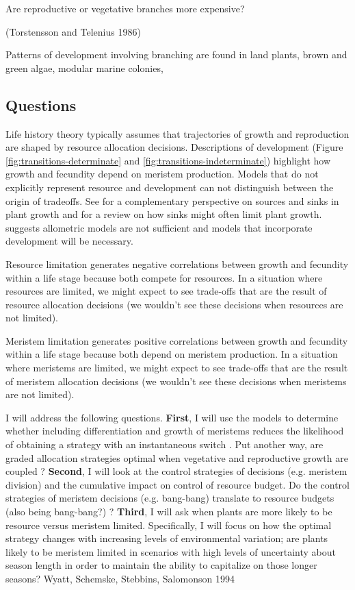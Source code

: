 \documentclass[12pt, oneside]{article}   	%
\begin{document}
Are reproductive or vegetative branches more expensive?

(Torstensson and Telenius 1986) 

Patterns of development involving branching are found in land plants, brown and green algae, modular marine colonies, 
\fi

\subsection{Questions}

Life history theory typically assumes that trajectories of growth and reproduction are shaped by resource allocation decisions. Descriptions of development (Figure \ref{fig:transitions-determinate} and \ref{fig:transitions-indeterminate}) highlight how growth and fecundity depend on meristem production. Models that do not explicitly represent resource and development can not distinguish between the origin of tradeoffs. See \cite{white2016} for a complementary perspective on sources and sinks in plant growth and \cite{korner2015} for a review on how sinks might often limit plant growth. \cite{Fox1992} suggests allometric models are not sufficient and models that incorporate development will be necessary.

Resource limitation generates negative correlations between growth and fecundity within a life stage because both compete for resources. In a situation where resources are limited, we might expect to see trade-offs that are the result of resource allocation decisions (we wouldn't see these decisions when resources are not limited).

Meristem limitation generates positive correlations between growth and fecundity within a life stage because both depend on meristem production. In a situation where meristems are limited, we might expect to see trade-offs that are the result of meristem allocation decisions (we wouldn't see these decisions when meristems are not limited). 

I will address the following questions. \textbf{First}, I will use the models to determine whether including differentiation and growth of meristems reduces the likelihood of obtaining a strategy with an instantaneous switch \cite{cohen1971}. Put another way, are graded allocation strategies optimal when vegetative and reproductive growth are coupled \cite{Fox1992}? \textbf{Second}, I will look at the control strategies of decisions (e.g. meristem division) and the cumulative impact on control of resource budget. Do the control strategies of meristem decisions (e.g. bang-bang) translate to resource budgets (also being bang-bang?) \cite{Fox1992}? \textbf{Third}, I will ask when plants are more likely to be resource versus meristem limited. Specifically, I will focus on how the optimal strategy changes with increasing levels of environmental variation; are plants likely to be meristem limited in scenarios with high levels of uncertainty about season length in order to maintain the ability to capitalize on those longer seasons? Wyatt, Schemske, Stebbins, Salomonson 1994 
\end{document}
